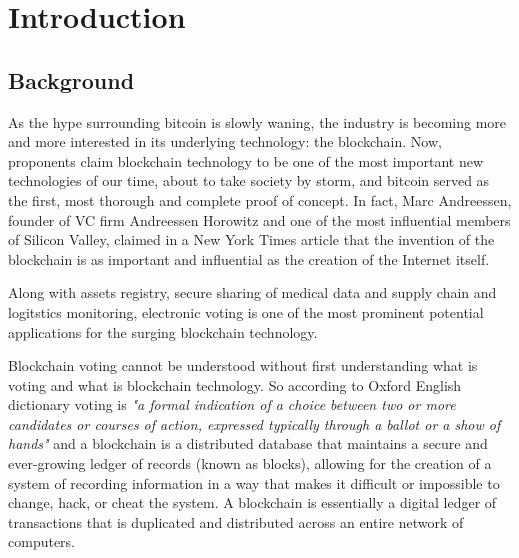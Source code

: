 \chapter{Introduction}
\section{Background}
As the hype surrounding bitcoin is slowly waning, the industry is becoming more and more interested in its underlying technology: the blockchain. Now, proponents claim blockchain technology to be one of the most important new technologies of our time, about to take society by storm, and bitcoin served as the first, most thorough and complete proof of concept. In fact, Marc Andreessen, founder of VC firm Andreessen Horowitz and one of the most influential members of Silicon Valley, claimed in a New York Times article that the invention of the blockchain is as important and influential as the creation of the Internet itself\cite{andreessenWhyBitcoinMatters1390323270}.\smallskip

Along with assets registry, secure sharing of medical data and supply chain and logitstics monitoring, electronic voting is one of the most prominent potential applications for the surging blockchain technology.

Blockchain voting cannot be understood without first understanding what is voting and what is blockchain technology. So according to Oxford English dictionary voting is \textit{"a formal indication of a choice between two or more candidates or courses of action, expressed typically through a ballot or a show of hands"} and a blockchain is a distributed database that maintains a secure and ever-growing ledger of records (known as blocks), allowing for the creation of a system of recording information in a way that makes it difficult or impossible to change, hack, or cheat the system. A blockchain is essentially a digital ledger of transactions that is duplicated and distributed across an entire network of computers.